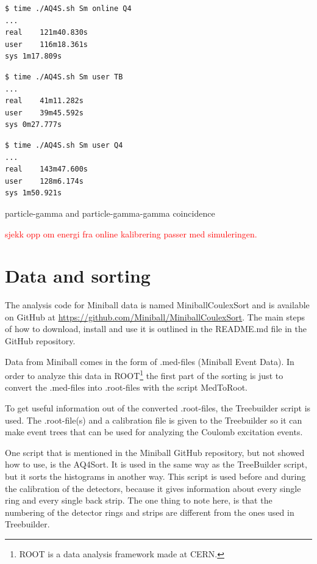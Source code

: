 \documentclass[twoside,english]{uiofysmaster/uiofysmaster}
\begin{document}
\begin{lstlisting}[language=sh]
$ time ./AQ4S.sh Sm online Q4
...
real	121m40.830s
user	116m18.361s
sys	1m17.809s
\end{lstlisting}


\begin{lstlisting}[language=sh]
$ time ./AQ4S.sh Sm user TB
...
real	41m11.282s
user	39m45.592s
sys	0m27.777s
\end{lstlisting}


\begin{lstlisting}[language=sh]
$ time ./AQ4S.sh Sm user Q4
...
real	143m47.600s
user	128m6.174s
sys	1m50.921s
\end{lstlisting}


\bigskip

particle-gamma and particle-gamma-gamma coincidence

\textcolor{red}{sjekk opp om energi fra online kalibrering passer med simuleringen.}

\section{Data and sorting}
The analysis code for Miniball data is named MiniballCoulexSort and is available on GitHub at \url{https://github.com/Miniball/MiniballCoulexSort}. 
The main steps of how to download, install and use it is outlined in the README.md file in the GitHub repository. 

Data from Miniball comes in the form of .med-files (Miniball Event Data). 
In order to analyze this data in ROOT\footnote{ROOT is a data analysis framework made at CERN.} the first part of the sorting is just to convert the .med-files into .root-files with the script MedToRoot. 

To get useful information out of the converted .root-files, the Treebuilder script is used. 
The .root-file(s) and a calibration file is given to the Treebuilder so it can make event trees that can be used for analyzing the Coulomb excitation events. 

One script that is mentioned in the Miniball GitHub repository, but not showed how to use, is the AQ4Sort. It is used in the same way as the TreeBuilder script, but it sorts the histograms in another way. 
This script is used before and during the calibration of the detectors, because it gives information about every single ring and every single back strip. The one thing to note here, is that the numbering of the detector rings and strips are different from the ones used in Treebuilder. 
\end{document}
